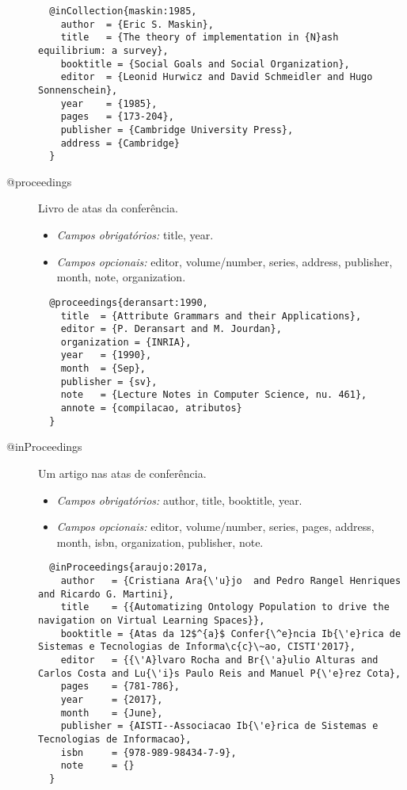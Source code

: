 \documentclass{article}%
\begin{document}
\begin{description}
  \begin{lstlisting}
  @inCollection{maskin:1985,
    author  = {Eric S. Maskin},
    title   = {The theory of implementation in {N}ash equilibrium: a survey},
    booktitle = {Social Goals and Social Organization},
    editor  = {Leonid Hurwicz and David Schmeidler and Hugo Sonnenschein},
    year    = {1985},
    pages   = {173-204},
    publisher = {Cambridge University Press},
    address = {Cambridge}
  }
  \end{lstlisting}


  \item[@proceedings] Livro de atas da conferência.
  \begin{itemize}
    \item \emph{Campos obrigatórios:} title, year.
    \item \emph{Campos opcionais:} editor, volume/number, series, address, publisher, month, note, organization.
  \end{itemize}

  \begin{lstlisting}
  @proceedings{deransart:1990,
    title  = {Attribute Grammars and their Applications},
    editor = {P. Deransart and M. Jourdan},
    organization = {INRIA},
    year   = {1990},
    month  = {Sep},
    publisher = {sv},
    note   = {Lecture Notes in Computer Science, nu. 461},
    annote = {compilacao, atributos}
  }
  \end{lstlisting}


  \item[@inProceedings]  Um artigo nas atas de conferência.
  \begin{itemize}
    \item \emph{Campos obrigatórios:} author, title, booktitle, year.
    \item \emph{Campos opcionais:} editor, volume/number, series, pages, address, month, isbn, organization, publisher, note.
  \end{itemize}

  \begin{lstlisting}
  @inProceedings{araujo:2017a,
    author   = {Cristiana Ara{\'u}jo  and Pedro Rangel Henriques and Ricardo G. Martini},
    title    = {{Automatizing Ontology Population to drive the navigation on Virtual Learning Spaces}},
    booktitle = {Atas da 12$^{a}$ Confer{\^e}ncia Ib{\'e}rica de Sistemas e Tecnologias de Informa\c{c}\~ao, CISTI'2017},
    editor   = {{\'A}lvaro Rocha and Br{\'a}ulio Alturas and Carlos Costa and Lu{\'i}s Paulo Reis and Manuel P{\'e}rez Cota},
    pages    = {781-786},
    year     = {2017},
    month    = {June},
    publisher = {AISTI--Associacao Ib{\'e}rica de Sistemas e Tecnologias de Informacao},
    isbn     = {978-989-98434-7-9},
    note     = {}
  }
  \end{lstlisting}



\end{description}
\end{document}
